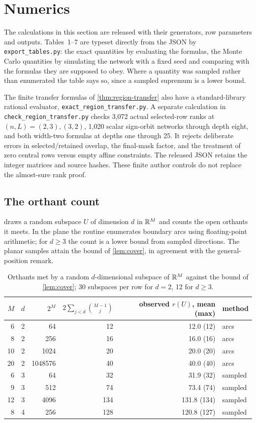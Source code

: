 \section{Numerics}
\label{sec:numerics}

The calculations in this section are released with their generators, row parameters and outputs. Tables~1--7 are typeset directly from the JSON by \texttt{export\_tables.py}: the exact quantities by evaluating the formulas, the Monte Carlo quantities by simulating the network with a fixed seed and comparing with the formulas they are supposed to obey. Where a quantity was sampled rather than enumerated the table says so, since a sampled supremum is a lower bound.

The finite transfer formulas of \cref{thm:region-transfer} also have a standard-library rational evaluator, \texttt{exact\_region\_transfer.py}. A separate calculation in \texttt{check\_region\_transfer.py} checks 3,072 actual selected-row ranks at $(n,L)=(2,3),(3,2)$, 1,020 scalar sign-orbit networks through depth eight, and both width-two formulas at depths one through 25. It rejects deliberate errors in selected/retained overlap, the final-mask factor, and the treatment of zero central rows versus empty affine constraints. The released JSON retains the integer matrices and source hashes. These finite author controls do not replace the almost-sure rank proof.

\subsection{The orthant count}

 draws a random subspace $U$ of dimension $d$ in $\mathbb{R}^M$ and counts the open orthants it meets. In the plane the routine enumerates boundary arcs using floating-point arithmetic; for $d\ge3$ the count is a lower bound from sampled directions. The planar samples attain the bound of \cref{lem:cover}, in agreement with the general-position remark.

\begin{table}[h]\centering
\begin{tabular}{rrrrrl}
\toprule
$M$ & $d$ & $2^M$ & $2\sum_{j<d}\binom{M-1}j$ & observed $r(U)$, mean (max) & method\\
\midrule
6 & 2 & 64 & 12 & 12.0 (12) & arcs\\
8 & 2 & 256 & 16 & 16.0 (16) & arcs\\
10 & 2 & 1024 & 20 & 20.0 (20) & arcs\\
20 & 2 & 1048576 & 40 & 40.0 (40) & arcs\\
6 & 3 & 64 & 32 & 31.9 (32) & sampled\\
9 & 3 & 512 & 74 & 73.4 (74) & sampled\\
12 & 3 & 4096 & 134 & 131.8 (134) & sampled\\
8 & 4 & 256 & 128 & 120.8 (127) & sampled\\
\bottomrule
\end{tabular}
\caption{Orthants met by a random $d$-dimensional subspace of $\mathbb{R}^M$ against the bound of \cref{lem:cover}; 30 subspaces per row for $d=2$, 12 for $d\ge3$.}
\label{tab:cover}
\end{table}

